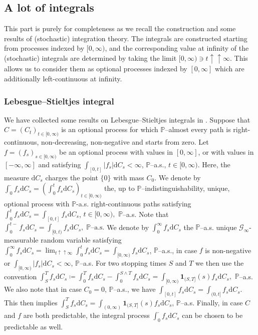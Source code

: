 \documentclass[10pt]{article} %
\newcommand\cG{\mathcal G}
\def \P{\mathbb{P}}
\newcommand{\1}{\mathbf{1}}
\def\d{\mathrm{d}}
\begin{document}
\subsection{A lot of integrals}\label{sec::integrals}

This part is purely for completeness as we recall the construction and some results of (stochastic) integration theory. The integrals are constructed starting from processes indexed by $[0,\infty)$, and the corresponding value at infinity of the (stochastic) integrals are determined by taking the limit $[0,\infty) \ni t \uparrow\uparrow \infty$. This allows us to consider them as optional processes indexed by $[0,\infty]$ which are additionally left-continuous at infinity.

\subsubsection{Lebesgue--Stieltjes integral}
We have collected some results on Lebesgue--Stieltjes integrals in . Suppose that $C = (C_t)_{t \in [0,\infty)}$ is an optional process for which $\P$--almost every path is right-continuous, non-decreasing, non-negative and starts from zero. Let $f = (f_s)_{s \in [0,\infty)}$ be an optional process with values in $[0,\infty]$, or with values in $[-\infty,\infty]$ and satisfying $\int_{[0,t]} |f_s| \d C_s < \infty$, $\P$--a.s., $t \in [0,\infty)$. Here, the measure $\d C_s$ charges the point $\{0\}$ with mass $C_0$. We denote by $\int_0^\cdot f_s \d C_s = (\int_0^t f_s \d C_s)_{t \in [0,\infty)}$ the, up to $\P$--indistinguishability, unique, optional process with $\P$-a.s. right-continuous paths satisfying  $\int_0^t f_s \d C_s = \int_{[0,t]} f_s \d C_s$, $t \in [0,\infty),$ $\P$--a.s. Note that $\int_0^{t-} f_s \d C_s = \int_{[0,t)} f_s \d C_s, \; \text{$\P$--a.s.}$ We denote by $\int_0^\infty f_s \d C_s$ the $\P$--a.s. unique $\cG_\infty$-measurable random variable satisfying $\int_0^\infty f_s \d C_s = \lim_{t \uparrow\uparrow \infty} \int_0^t f_s \d C_s = \int_{[0,\infty)} f_s \d C_s$, $\P$--a.s., in case $f$ is non-negative or $\int_{[0,\infty)} |f_s| \d C_s < \infty$, $\P$--a.s.
For two stopping times $S$ and $T$ we then use the convention $\int_S^T f_s \d C_s \coloneqq \int_0^T f_s \d C_s - \int_0^{S \land T} f_s \d C_s = \int_{[0,\infty)} \mathbf{1}_{(S,T]}(s) f_s \d C_s,$ $\P$--a.s. We also note that in case $C_0 = 0$, $\P$--a.s., we have $\int_{[0,t]} f_s \d C_s = \int_{(0,t]} f_s \d C_s$. This then implies $\int_S^T f_s \d C_s = \int_{(0,\infty)} \mathbf{1}_{(S,T]}(s) f_s \d C_s$, $\P$--a.s. Finally, in case $C$ and $f$ are both predictable, the integral process $\int_0^\cdot f_s \d C_s$ can be chosen to be predictable as well.
\end{document}
